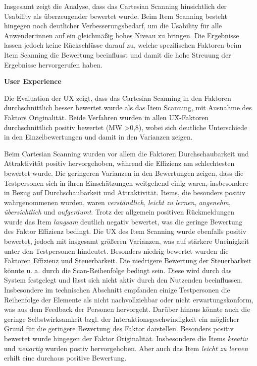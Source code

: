 Insgesamt zeigt die Analyse, dass das Cartesian Scanning hinsichtlich der Usability als überzeugender bewertet wurde. Beim Item Scanning besteht hingegen noch deutlicher Verbesserungsbedarf, um die Usability für alle Anwender:innen auf ein gleichmäßig hohes Niveau zu bringen. Die Ergebnisse lassen jedoch keine Rückschlüsse darauf zu, welche spezifischen Faktoren beim Item Scanning die Bewertung beeinflusst und damit die hohe Streuung der Ergebnisse hervorgerufen haben. 

\textbf{User Experience}

Die Evaluation der UX zeigt, dass das Cartesian Scanning in den Faktoren durchschnittlich besser bewertet wurde als das Item Scanning, mit Ausnahme des Faktors Originalität. Beide Verfahren wurden in allen UX-Faktoren durchschnittlich positiv bewertet (MW >0,8), wobei sich deutliche Unterschiede in den Einzelbewertungen und damit in den Varianzen zeigen.

Beim Cartesian Scanning wurden vor allem die Faktoren Durchschaubarkeit und Attraktivität positiv hervorgehoben, während die Effizienz am schlechtesten bewertet wurde. Die geringeren Varianzen in den Bewertungen zeigen, dass die Testpersonen sich in ihren Einschätzungen weitgehend einig waren, insbesondere in Bezug auf Durchschaubarkeit und Attraktivität. Items, die besonders positiv wahrgenommenen wurden, waren \textit{verständlich}, \textit{leicht zu lernen}, \textit{angenehm}, \textit{übersichtlich} und \textit{aufgeräumt}. Trotz der allgemein positiven Rückmeldungen wurde das Item \textit{langsam} deutlich negativ bewertet, was die geringe Bewertung des Faktor Effizienz bedingt.
Die UX des Item Scanning wurde ebenfalls positiv bewertet, jedoch mit insgesamt größeren Varianzen, was auf stärkere Uneinigkeit unter den Testpersonen hindeutet. Besonders niedrig bewertet wurden die Faktoren Effizienz und Steuerbarkeit. Die niedrigere Bewertung der Steuerbarkeit könnte u. a. durch die Scan-Reihenfolge bedingt sein. Diese wird durch das System festgelegt und lässt sich nicht aktiv durch den Nutzenden beeinflussen. Insbesondere im technischen Abschnitt empfanden einige Testpersonen die Reihenfolge der Elemente als nicht nachvollziehbar oder nicht erwartungskonform, was aus dem Feedback der Personen hervorgeht. Darüber hinaus könnte auch die geringe Selbstwirksamkeit bzgl. der Interaktionsgeschwindigkeit ein möglicher Grund für die geringere Bewertung des Faktor darstellen. 
Besonders positiv bewertet wurde hingegen der Faktor Originalität. Insbesondere die Items \textit{kreativ} und \textit{neuartig} wurden postiv hervorgehoben. Aber auch das Item \textit{leicht zu lernen} erhilt eine durchaus positive Bewertung. 

